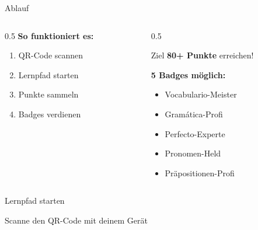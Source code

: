\documentclass[aspectratio=169,11pt]{beamer}
\begin{document}
\begin{frame}{Ablauf}

\begin{columns}
\begin{column}{0.5\textwidth}
\textbf{So funktioniert es:}
\begin{enumerate}
    \item QR-Code scannen
    \item Lernpfad starten
    \item Punkte sammeln
    \item Badges verdienen
\end{enumerate}
\end{column}

\begin{column}{0.5\textwidth}
\begin{block}{Ziel}
\centering
\textbf{80+ Punkte} erreichen!
\end{block}

\vspace{3mm}

\textbf{5 Badges möglich:}
\begin{itemize}
    \item Vocabulario-Meister
    \item Gramática-Profi
    \item Perfecto-Experte
    \item Pronomen-Held
    \item Präpositionen-Profi
\end{itemize}
\end{column}
\end{columns}

\end{frame}


\begin{frame}{Lernpfad starten}

\begin{center}

\vspace{5mm}


\vspace{8mm}

{\large\color{gray}Scanne den QR-Code mit deinem Gerät}

\end{center}

\end{frame}
\end{document}
